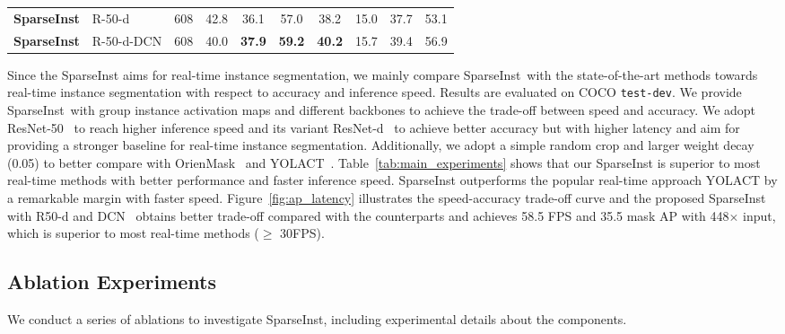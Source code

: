 \documentclass[10pt,twocolumn,letterpaper]{article}
\newcommand{\name}{SparseInst}
\newcommand{\tb}[1]{\textbf{#1}}
\begin{document}
\begin{table*}[htb]
{\begin{tabular}{l|l|cl|ccc|ccc}
    \textbf{\name} & R-50-d & 608 & 42.8 & 36.1 & 57.0 & 38.2 & 15.0 & 37.7 & 53.1 \\
\textbf{\name} & R-50-d-DCN & 608 & 40.0 & \tb{37.9} & \tb{59.2} & \tb{40.2} & 15.7 & 39.4 & 56.9 \\
\end{tabular}}
    \vspace{-5pt}
    \caption{\textbf{COCO Instance Segmentation.} Comparisons with state-of-the-art methods for mask AP and speed on COCO \texttt{test-dev}. Inference speeds of all models are tested on our machine with one NVIDIA RTX 2080Ti except those marked with $^\dag$, which are inherited from their publications. }
    \label{tab:main_experiments}
    \vspace{-10pt}
\end{table*}



Since the SparseInst aims for real-time instance segmentation, we mainly compare \name~with the state-of-the-art methods towards real-time instance segmentation with respect to accuracy and inference speed. Results are evaluated on COCO \texttt{test-dev}. 
We provide \name~with group instance activation maps and different backbones to achieve the trade-off between speed and accuracy. 
We adopt ResNet-50~\cite{HeZRS16} to reach higher inference speed and its variant ResNet-d~\cite{he2018bag} to achieve better accuracy but with higher latency and aim for providing a stronger baseline for real-time instance segmentation.
Additionally, we adopt a simple random crop and larger weight decay (0.05) to better compare with OrienMask~\cite{orien_maskabs-2106-12204} and YOLACT~\cite{YolactBolyaZXL19}.
Table~\ref{tab:main_experiments} shows that our \name{} is superior to most real-time methods with better performance and faster inference speed.
SparseInst outperforms the popular real-time approach YOLACT by a remarkable margin with faster speed. 
Figure~\ref{fig:ap_latency} illustrates the speed-accuracy trade-off curve and the proposed SparseInst with R50-d and DCN~\cite{DCNZhuHLD19} obtains better trade-off compared with the counterparts and achieves 58.5 FPS and 35.5 mask AP with 448$\times$ input, which is superior to most real-time methods ($\ge$ 30FPS).







\subsection{Ablation Experiments}
We conduct a series of ablations to investigate \name, including experimental details about the components.
\end{document}
